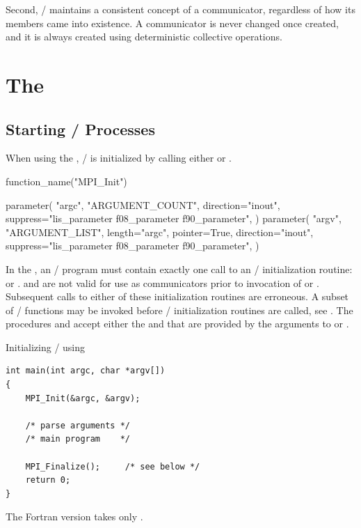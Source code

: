 Second, \mpi/ maintains a consistent concept of a communicator, regardless
of how its members came into existence.
A communicator is never changed once created, and it is always
created using deterministic collective operations.

\section{The \texorpdfstring{\wpm}{World Model}}
\label{sec:dynamic:initialization}

\subsection{Starting \texorpdfstring{\mpi/}{MPI} Processes}
\label{sec:inquiry-startup}

\label{sec:misc-init}

When using the \wpm{}, \MPI/ is initialized by calling
either  or .

\begin{mpi-binding}
    function_name("MPI_Init")

    parameter(
        "argc",
        "ARGUMENT_COUNT",
        direction="inout",
        suppress="lis_parameter f08_parameter f90_parameter",
    )
    parameter(
        "argv",
        "ARGUMENT_LIST",
        length="argc",
        pointer=True,
        direction="inout",
        suppress="lis_parameter f08_parameter f90_parameter",
    )
\end{mpi-binding}

In the \wpm{},  an \MPI/ program must contain exactly one call to an \MPI/ initialization routine:
 or .  and  are not valid for use as communicators
prior to invocation of  or .  Subsequent calls to either of these
initialization routines are erroneous. A subset of \MPI/ functions may be invoked
before \MPI/ initialization routines are called, see .
The procedures  and  accept either the  and  that are provided by the arguments to
 or .
\begin{example}
%
Initializing \MPI/ using 
\begin{lstlisting}[language={[MPI]C}]
int main(int argc, char *argv[])
{
    MPI_Init(&argc, &argv);

    /* parse arguments */
    /* main program    */

    MPI_Finalize();     /* see below */
    return 0;
}
\end{lstlisting}
\end{example}
The Fortran version takes only .

